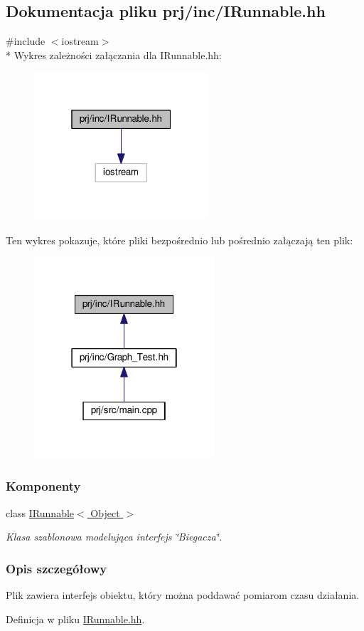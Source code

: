 \hypertarget{_i_runnable_8hh}{\subsection{Dokumentacja pliku prj/inc/\-I\-Runnable.hh}
\label{_i_runnable_8hh}
}
{\ttfamily \#include $<$iostream$>$}\\*
Wykres zależności załączania dla I\-Runnable.\-hh\-:
\nopagebreak
\begin{figure}[H]
\begin{center}
\leavevmode
\includegraphics[width=184pt]{_i_runnable_8hh__incl}
\end{center}
\end{figure}
Ten wykres pokazuje, które pliki bezpośrednio lub pośrednio załączają ten plik\-:
\nopagebreak
\begin{figure}[H]
\begin{center}
\leavevmode
\includegraphics[width=190pt]{_i_runnable_8hh__dep__incl}
\end{center}
\end{figure}
\subsubsection*{Komponenty}
\begin{DoxyCompactItemize}
\item 
class \hyperlink{class_i_runnable}{I\-Runnable$<$ Object $>$}
\begin{DoxyCompactList}\small\item\em Klasa szablonowa modelująca interfejs \char`\"{}\-Biegacza\char`\"{}. \end{DoxyCompactList}\end{DoxyCompactItemize}


\subsubsection{Opis szczegółowy}
Plik zawiera interfejs obiektu, który można poddawać pomiarom czasu działania. 

Definicja w pliku \hyperlink{_i_runnable_8hh_source}{I\-Runnable.\-hh}.


